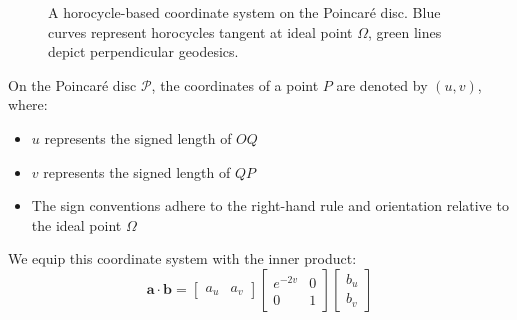 \begin{figure}[ht]
\centering
{}
\caption{A horocycle-based coordinate system on the Poincaré disc. Blue curves represent horocycles tangent at ideal point $\Omega$, green lines depict perpendicular geodesics.}\label{fig:horocyclecoord}
\end{figure}

On the Poincaré disc $\mathcal{P}$, the coordinates of a point $P$ are denoted by $(u,v)$, where:
\begin{itemize}
\item $u$ represents the signed length of $OQ$
\item $v$ represents the signed length of $QP$
\item The sign conventions adhere to the right-hand rule and orientation relative to the ideal point $\Omega$
\end{itemize}

We equip this coordinate system with the inner product:
$$
\mathbf{a} \cdot \mathbf{b} = \begin{bmatrix} a_u & a_v \end{bmatrix} \begin{bmatrix} e^{-2v} & 0 \\ 0 & 1 \end{bmatrix} \begin{bmatrix} b_u \\ b_v \end{bmatrix}
$$

